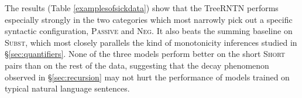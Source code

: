 The results (Table \ref{examplesofsickdata}) show that the TreeRNTN performs especially strongly in the two categories which most narrowly pick out a specific syntactic configuration, \textsc{Passive} and \textsc{Neg}. It also beats the summing baseline on \textsc{Subst}, which most closely parallels the kind of monotonicity inferences studied in \S\ref{sec:quantifiers}. None of the three models perform better on the short \textsc{Short} pairs than on the rest of the data, suggesting that the decay phenomenon observed in \S\ref{sec:recursion} may not hurt the performance of models trained on typical natural language sentences.